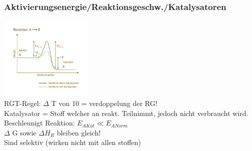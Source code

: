 \subsubsection{Aktivierungsenergie/Reaktionsgeschw./Katalysatoren}
\includegraphics[height=4cm]{pictures/Katalysator.png}\\
RGT-Regel: $\Delta$ T von 10 = verdoppelung der RG!\\
Katalysator = Stoff welcher an reakt. Teilnimmt, jedoch nicht verbraucht wird.\\
Beschleunigt Reaktion: $E_{AKat} \ll E_{ANorm}$\\
$\Delta$ G sowie $\Delta H_R$ bleiben gleich!\\
Sind selektiv (wirken nicht mit allen stoffen)
